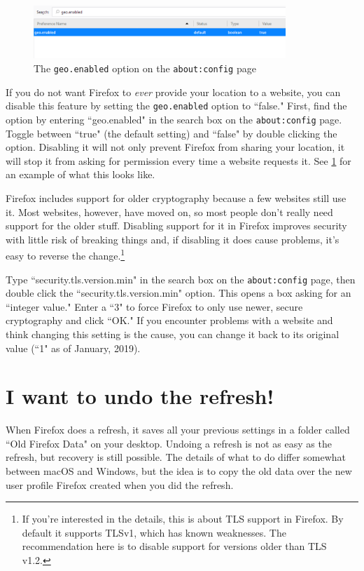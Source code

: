 \documentclass[fontsize=11pt]{article}
\begin{document}
\begin{figure}[h]
	\centering
	\includegraphics[width=0.85\textwidth]{images/about-config.png}
	\caption{The \texttt{geo.enabled} option on the \texttt{about:config} page}
	\label{fig:about-config}
\end{figure}

If you do not want Firefox to \emph{ever} provide your location to a website, you can disable this feature by setting the \texttt{geo.enabled} option to ``false."  First, find the option by entering ``geo.enabled" in the search box on the \texttt{about:config} page.  Toggle between ``true" (the default setting) and ``false" by double clicking the option.  Disabling it will not only prevent Firefox from sharing your location, it will stop it from asking for permission every time a website requests it.  See \cref{fig:about-config} for an example of what this looks like.



Firefox includes support for older cryptography because a few websites still use it.  Most websites, however, have moved on, so most people don't really need support for the older stuff.  Disabling support for it in Firefox improves security with little risk of breaking things and, if disabling it does cause problems, it's easy to reverse the change.\footnote{If you're interested in the details, this is about TLS support in Firefox.  By default it supports TLSv1, which has known weaknesses.  The recommendation here is to disable support for versions older than TLS v1.2.}

Type ``security.tls.version.min" in the search box on the \texttt{about:config} page, then double click the ``security.tls.version.min" option.  This opens a box asking for an ``integer value."  Enter a ``3" to force Firefox to only use newer, secure cryptography and click ``OK."  If you encounter problems with a website and think changing this setting is the cause, you can change it back to its original value (``1" as of January, 2019).


\section{I want to undo the refresh!}\label{section:undo-the-refresh}
When Firefox does a refresh, it saves all your previous settings in a folder called ``Old Firefox Data" on your desktop.  Undoing a refresh is not as easy as the refresh, but recovery is still possible.  The details of what to do differ somewhat between macOS and Windows, but the idea is to copy the old data over the new user profile Firefox created when you did the refresh.
\end{document}
